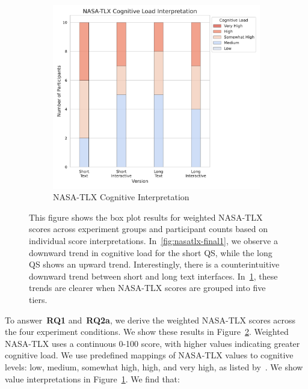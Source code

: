 \begin{figure}[ht]
\begin{subfigure}[b]{0.47\textwidth}
        \includegraphics[width=\textwidth]{content/image/results/nasatlx_cog_value_interpreted.pdf}
        \caption{NASA-TLX Cognitive Interpretation}
        \label{fig:nasatlx-final2}
    \end{subfigure}
    \caption{This figure shows the box plot results for weighted NASA-TLX scores across experiment groups and participant counts based on individual score interpretations. In~\ref{fig:nasatlx-final1}, we observe a downward trend in cognitive load for the short QS, while the long QS shows an upward trend. Interestingly, there is a counterintuitive downward trend between short and long text interfaces. In~\ref{fig:nasatlx-final2}, these trends are clearer when NASA-TLX scores are grouped into five tiers.}
    \label{fig:nasatlx-final}
\end{figure}

To answer~\textbf{RQ1} and~\textbf{RQ2a}, we derive the weighted NASA-TLX scores across the four experiment conditions. We show these results in Figure~\ref{fig:nasatlx-final}. Weighted NASA-TLX uses a continuous 0-100 score, with higher values indicating greater cognitive load. We use predefined mappings of NASA-TLX values to cognitive levels: low, medium, somewhat high, high, and very high, as listed by~\textcite{hart1988development}. We show value interpretations in Figure~\ref{fig:nasatlx-final2}. We find that:

